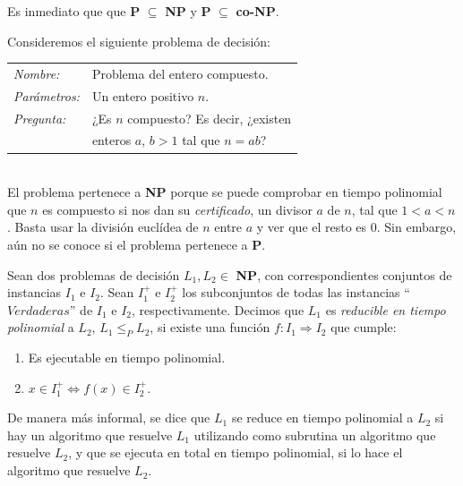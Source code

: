 Es inmediato que  que \textbf{P} $\subseteq$ \textbf{NP} y \textbf{P} $\subseteq$ \textbf{co-NP}.

\begin{example}
	Consideremos el siguiente problema de decisión:

	\begin{tabular}{|ll}
		\textit{Nombre:} & Problema del entero compuesto. \\
		\textit{Parámetros:} & Un entero positivo $n$. \\
		\textit{Pregunta:} & ¿Es $n$ compuesto? Es decir, ¿existen \\
		&  enteros $a$, $b > 1$ tal que $n=ab$? \\
	\end{tabular}
	\\

	El problema pertenece a \textbf{NP} porque se puede comprobar en tiempo polinomial que
	$n$ es compuesto si nos dan su \textit{certificado}, un divisor $a$ de $n$, tal que $1 < a < n$.
	Basta usar la división euclídea de $n$ entre $a$ y ver que el resto es $0$. Sin embargo,
	aún no se conoce si el problema pertenece a \textbf{P}.
\end{example}


\hfil

\begin{definition}
	\label{reducePoly:def}
	Sean dos problemas de decisión $L_1, L_2 \in $ \textbf{NP}, con correspondientes
	conjuntos de instancias $I_1$ e $I_2$. Sean $I_1^+$ e $I_2^+$ los subconjuntos
	de todas las instancias ``$Verdaderas$'' de $I_1$ e $I_2$, respectivamente.
	Decimos que $L_1$ es \textit{reducible en tiempo polinomial} a $L_2$, $L_1
	\leq_P L_2$, si existe una función $f:I_1 \Rightarrow I_2$ que cumple:

	\begin{enumerate}
		\item Es ejecutable en tiempo polinomial.
		\item $x \in I_1^+  \Leftrightarrow  f(x) \in I_2^+ $.
	\end{enumerate}
\end{definition}

\hfil

De manera más informal, se dice que $L_1$ se reduce en tiempo polinomial a
$L_2$ si hay un algoritmo que resuelve $L_1$ utilizando como subrutina un
algoritmo que resuelve $L_2$, y que se ejecuta en total en tiempo polinomial,
si lo hace el algoritmo que resuelve $L_2$.

